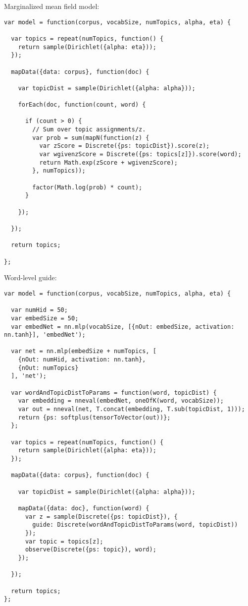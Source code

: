 Marginalized mean field model:
\begin{lstlisting}
var model = function(corpus, vocabSize, numTopics, alpha, eta) {

  var topics = repeat(numTopics, function() {
    return sample(Dirichlet({alpha: eta}));
  });

  mapData({data: corpus}, function(doc) {

    var topicDist = sample(Dirichlet({alpha: alpha}));

    forEach(doc, function(count, word) {

      if (count > 0) {
        // Sum over topic assignments/z.
        var prob = sum(mapN(function(z) {
          var zScore = Discrete({ps: topicDist}).score(z);
          var wgivenzScore = Discrete({ps: topics[z]}).score(word);
          return Math.exp(zScore + wgivenzScore);
        }, numTopics));

        factor(Math.log(prob) * count);
      }

    });

  });

  return topics;

};
\end{lstlisting}

Word-level guide:
\begin{lstlisting}
var model = function(corpus, vocabSize, numTopics, alpha, eta) {

  var numHid = 50;
  var embedSize = 50;
  var embedNet = nn.mlp(vocabSize, [{nOut: embedSize, activation: nn.tanh}], 'embedNet');

  var net = nn.mlp(embedSize + numTopics, [
    {nOut: numHid, activation: nn.tanh},
    {nOut: numTopics}
  ], 'net');

  var wordAndTopicDistToParams = function(word, topicDist) {
    var embedding = nneval(embedNet, oneOfK(word, vocabSize));
    var out = nneval(net, T.concat(embedding, T.sub(topicDist, 1)));
    return {ps: softplus(tensorToVector(out))};
  };

  var topics = repeat(numTopics, function() {
    return sample(Dirichlet({alpha: eta}));
  });

  mapData({data: corpus}, function(doc) {

    var topicDist = sample(Dirichlet({alpha: alpha}));

    mapData({data: doc}, function(word) {
      var z = sample(Discrete({ps: topicDist}), {
        guide: Discrete(wordAndTopicDistToParams(word, topicDist))
      });
      var topic = topics[z];
      observe(Discrete({ps: topic}), word);
    });

  });

  return topics;
};
\end{lstlisting}

